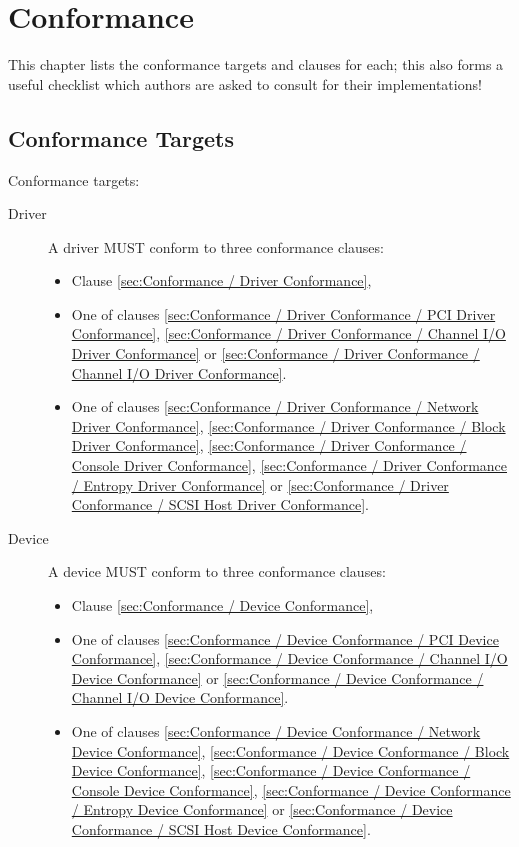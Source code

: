 \chapter{Conformance}

This chapter lists the conformance targets and clauses for each; this
also forms a useful checklist which authors are asked to consult for their
implementations!

\section{Conformance Targets}\label{sec:Conformance / Conformance Targets}

Conformance targets:
\begin{description}
\item[Driver] A driver MUST conform to three conformance clauses:
  \begin{itemize}
    \item Clause \ref{sec:Conformance / Driver Conformance},
    \item One of clauses \ref{sec:Conformance / Driver Conformance / PCI Driver Conformance}, \ref{sec:Conformance / Driver Conformance / Channel I/O Driver Conformance} or \ref{sec:Conformance / Driver Conformance / Channel I/O Driver Conformance}.
    \item One of clauses \ref{sec:Conformance / Driver Conformance / Network Driver Conformance}, \ref{sec:Conformance / Driver Conformance / Block Driver Conformance}, \ref{sec:Conformance / Driver Conformance / Console Driver Conformance}, \ref{sec:Conformance / Driver Conformance / Entropy Driver Conformance} or \ref{sec:Conformance / Driver Conformance / SCSI Host Driver Conformance}.
  \end{itemize}
\item[Device] A device MUST conform to three conformance clauses:
  \begin{itemize}
    \item Clause \ref{sec:Conformance / Device Conformance},
    \item One of clauses \ref{sec:Conformance / Device Conformance / PCI Device Conformance}, \ref{sec:Conformance / Device Conformance / Channel I/O Device Conformance} or \ref{sec:Conformance / Device Conformance / Channel I/O Device Conformance}.
    \item One of clauses \ref{sec:Conformance / Device Conformance / Network Device Conformance}, \ref{sec:Conformance / Device Conformance / Block Device Conformance}, \ref{sec:Conformance / Device Conformance / Console Device Conformance}, \ref{sec:Conformance / Device Conformance / Entropy Device Conformance} or \ref{sec:Conformance / Device Conformance / SCSI Host Device Conformance}.
  \end{itemize}
\end{description}

